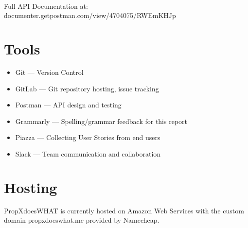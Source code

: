 \documentclass[12pt]{article}
\begin{document}
~\\
Full API Documentation at: documenter.getpostman.com/view/4704075/RWEmKHJp

\section{Tools}

\begin{itemize}
	\item Git		--- Version Control
	\item GitLab	--- Git repository hosting, issue tracking
	\item Postman	--- API design and testing %
	\item Grammarly	--- Spelling/grammar feedback for this report
	\item Piazza	--- Collecting User Stories from end users
	\item Slack		--- Team communication and collaboration
\end{itemize}

\section{Hosting}

PropXdoesWHAT is currently hosted on Amazon Web Services with the custom domain propxdoeswhat.me provided by Namecheap.
\end{document}
